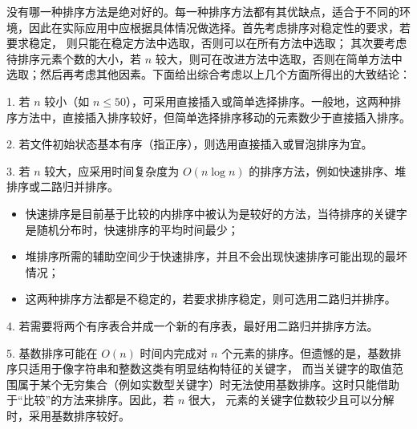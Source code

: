 \documentclass[lang=cn,newtx,10pt,scheme=chinese]{elegantbook}
\begin{document}
没有哪一种排序方法是绝对好的。每一种排序方法都有其优缺点，适合于不同的环境，因此在实际应用中应根据具体情况做选择。首先考虑排序对稳定性的要求，若要求稳定，
则只能在稳定方法中选取，否则可以在所有方法中选取；
其次要考虑待排序元素个数的大小，若 $n$ 较大，则可在改进方法中选取，否则在简单方法中选取；然后再考虑其他因素。下面给出综合考虑以上几个方面所得出的大致结论：

1. 若 $n$ 较小（如 $n \leq 50$），可采用直接插入或简单选择排序。一般地，这两种排序方法中，直接插入排序较好，但简单选择排序移动的元素数少于直接插入排序。

2. 若文件初始状态基本有序（指正序），则选用直接插入或冒泡排序为宜。

3. 若 $n$ 较大，应采用时间复杂度为 $O(n \log n)$ 的排序方法，例如快速排序、堆排序或二路归并排序。
   \begin{itemize}
     \item 快速排序是目前基于比较的内排序中被认为是较好的方法，当待排序的关键字是随机分布时，快速排序的平均时间最少；
     \item 堆排序所需的辅助空间少于快速排序，并且不会出现快速排序可能出现的最坏情况；
     \item 这两种排序方法都是不稳定的，若要求排序稳定，则可选用二路归并排序。
   \end{itemize}

4. 若需要将两个有序表合并成一个新的有序表，最好用二路归并排序方法。

5. 基数排序可能在 $O(n)$ 时间内完成对 $n$ 个元素的排序。但遗憾的是，基数排序只适用于像字符串和整数这类有明显结构特征的关键字，
而当关键字的取值范围属于某个无穷集合（例如实数型关键字）时无法使用基数排序。这时只能借助于“比较”的方法来排序。因此，若 $n$ 很大，
元素的关键字位数较少且可以分解时，采用基数排序较好。
\end{document}
